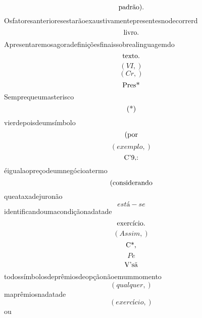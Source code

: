 \documentclass{article}
\begin{document}
\begin{equation}
$padrão).$
\end{equation}Osfatoresanterioresestarãoexaustivamentepresentesnodecorrerd\begin{equation}
$livro.$
\end{equation}Apresentaremosagoradefiniçõesfinaissobrealinguagemdo\begin{equation}
$texto.$
\end{equation}\begin{equation}
\left( VI,\right)
\end{equation}\begin{equation}
\left( Cr,\right)
\end{equation}\begin{equation}
$Pres*$
\end{equation}Semprequeumasterisco\begin{equation}
$(*)$
\end{equation}vierdepoisdeumsímbolo\begin{equation}
$(por$
\end{equation}\begin{equation}
\left( exemplo,\right)
\end{equation}\begin{equation}
$C'9,:$
\end{equation}éigualaopreçodeumnegócioatermo\begin{equation}
$(considerando$
\end{equation}queataxadejuronão\begin{equation}
está - se
\end{equation}identificandoumacondiçãonadatade\begin{equation}
$exercício.$
\end{equation}\begin{equation}
\left( Assim,\right)
\end{equation}\begin{equation}
$C*,$
\end{equation}\begin{equation}
P e
\end{equation}\begin{equation}
$V'sã$
\end{equation}todossímbolosdeprêmiosdeopçãonãoemummomento\begin{equation}
\left( qualquer,\right)
\end{equation}maprêmiosnadatade\begin{equation}
\left( exercício,\right)
\end{equation}ou\begin{equation}

\end{equation}
\end{document}
